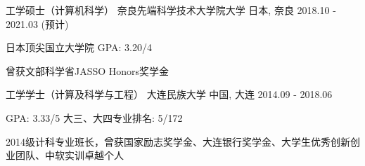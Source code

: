 
\begin{cventries}
 \cventry
    {工学硕士（计算机科学）} %
    {奈良先端科学技术大学院大学} %
    {日本, 奈良} %
    {2018.10 - 2021.03 (预计)} %
    {
      \begin{cvitems}
      \item {日本顶尖国立大学院 \quad GPA: 3.20/4}
      \item {曾获文部科学省JASSO Honors奖学金}%
      \end{cvitems}
    }

  \cventry
    {工学学士（计算及科学与工程）} %
    {大连民族大学} %
    {中国, 大连} %
    {2014.09 - 2018.06} %
    {
      \begin{cvitems} %
      \item {GPA: 3.33/5 \quad 大三、大四专业排名: 5/172}
      \item {2014级计科专业班长，曾获国家励志奖学金、大连银行奖学金、大学生优秀创新创业团队、中软实训卓越个人}
      \end{cvitems}
    }

\end{cventries}
